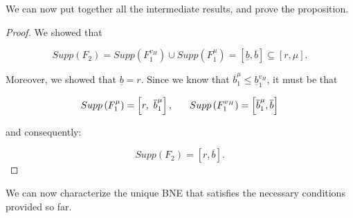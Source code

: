 \documentclass[11pt]{article}
\theoremstyle{plain}
\theoremstyle{definition}
\theoremstyle{plain}
\theoremstyle{plain}
\theoremstyle{plain}
\theoremstyle{plain}
\numberwithin{equation}{section}
\begin{document}
\vspace{0.4cm}

\noindent We can now put together all the intermediate results, and prove the proposition.

\begin{proof}
We showed that

\begin{equation*}
 Supp(F_2) = Supp\left(F_1^{v_H}\right) \cup Supp\left(F_1^{\mu}\right) = [\underline b, \overline b] \subseteq [r, \mu].   
\end{equation*} 

\vspace{0.2cm}

\noindent Moreover, we showed that $ \underline b = r $. Since we know that $ \overline{b}_1^{\mu} \leq \underline{b}_1^{v_H} $, it must be that

\begin{align}\label{eq:supp-d1}
Supp\left(F_1^{\mu}\right) = \left[r,\ \overline{b}_1^{\mu}\right], \hspace{0.6cm} Supp\left(F_1^{v_H}\right) = \left[\overline{b}_1^{\mu}, \overline b\right]    
\end{align}

\noindent and consequently:

\begin{equation}\label{eq:supp-d2}
 Supp(F_2) = [r, \overline{b}].
\end{equation}


\end{proof}

\vspace{0.4cm}

\noindent We can now characterize the unique BNE that satisfies the necessary conditions provided so far. 

\vspace{0.4cm}
\end{document}
